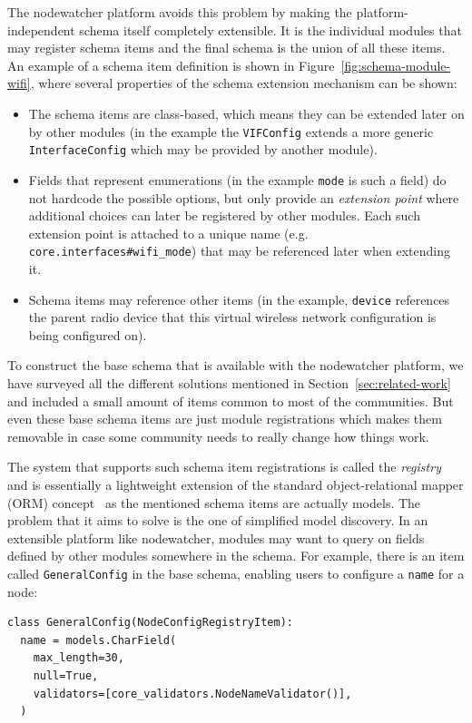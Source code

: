 \documentclass[5p,sort&compress]{elsarticle}
\begin{document}
The nodewatcher platform avoids this problem by making the platform-independent schema itself completely extensible.
It is the individual modules that may register schema items and the final schema is the union of all these items.
An example of a schema item definition is shown in Figure~\ref{fig:schema-module-wifi}, where several properties of the schema extension mechanism can be shown:
\begin{itemize}
    \item The schema items are class-based, which means they can be extended later on by other modules (in the example the \texttt{VIFConfig} extends a more generic \texttt{InterfaceConfig} which may be provided by another module).
    \item Fields that represent enumerations (in the example \texttt{mode} is such a field) do not hardcode the possible options, but only provide an \textit{extension point} where additional choices can later be registered by other modules.
    Each such extension point is attached to a unique name (e.g. \texttt{core.interfaces\#wifi\_mode}) that may be referenced later when extending it.
    \item Schema items may reference other items (in the example, \texttt{device} references the parent radio device that this virtual wireless network configuration is being configured on).
\end{itemize}

To construct the base schema that is available with the nodewatcher platform, we have surveyed all the different solutions mentioned in Section~\ref{sec:related-work} and included a small amount of items common to most of the communities.
But even these base schema items are just module registrations which makes them removable in case some community needs to really change how things work.

The system that supports such schema item registrations is called the \textit{registry} and is essentially a lightweight extension of the standard object-relational mapper (ORM) concept~\cite{ONeil_2008} as the mentioned schema items are actually models.
The problem that it aims to solve is the one of simplified model discovery. In an extensible platform like nodewatcher, modules may want to query on fields defined by other modules somewhere in the schema. For example, there is an item called \texttt{GeneralConfig} in the base schema, enabling users to configure a \texttt{name} for a node:

\begin{verbatim}
class GeneralConfig(NodeConfigRegistryItem):
  name = models.CharField(
    max_length=30,
    null=True,
    validators=[core_validators.NodeNameValidator()],
  )
\end{verbatim}
\end{document}
